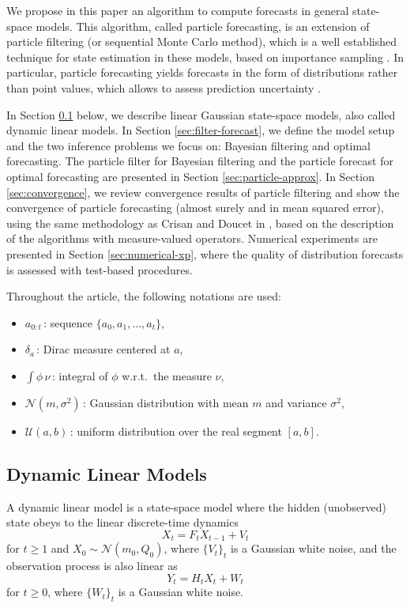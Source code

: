 \documentclass{article}
\begin{document}
We propose in this paper an algorithm to compute forecasts in general state-space models. This algorithm, called particle forecasting, is an extension of particle filtering (or sequential Monte Carlo method), which is a well established technique for state estimation in these models, based on importance sampling \cite{Arulampalam2002,Doucet2000,Doucet2011}. In particular, particle forecasting yields forecasts in the form of distributions rather than point values, which allows to assess prediction uncertainty \cite{Gneiting2014}.

In Section \ref{sec:dlm} below, we describe linear Gaussian state-space models, also called dynamic linear models. In Section \ref{sec:filter-forecast}, we define the model setup and the two inference problems we focus on: Bayesian filtering and optimal forecasting. The particle filter for Bayesian filtering and the particle forecast for optimal forecasting are presented in Section \ref{sec:particle-approx}. In Section \ref{sec:convergence}, we review convergence results of particle filtering and show the convergence of particle forecasting (almost surely and in mean squared error), using the same methodology as Crisan and Doucet in \cite{Crisan2002}, based on the description of the algorithms with measure-valued operators. Numerical experiments are presented in Section \ref{sec:numerical-xp}, where the quality of distribution forecasts is assessed with test-based procedures.

Throughout the article, the following notations are used:
\begin{itemize}
    \item $a_{0:t}$\,: sequence $\{a_0,a_1,\dots,a_t\}$,
    \item $\delta_a$\,: Dirac measure centered at $a$,
    \item $\displaystyle \int \phi \, \nu$\,: integral of $\phi$ w.r.t.\ the measure $\nu$,
    \item $\mathcal N(m,\sigma^2)$\,: Gaussian distribution with mean $m$ and variance $\sigma^2$,
    \item $\mathcal U(a,b)$\,: uniform distribution over the real segment $[a,b]$.
\end{itemize}

\subsection{Dynamic Linear Models}
\label{sec:dlm}

A dynamic linear model is a state-space model where the hidden (unobserved) state obeys to the linear discrete-time dynamics
\begin{equation*}
    X_t = F_t X_{t-1} + V_t
\end{equation*}
for $t \geq 1$ and $X_0 \sim \mathcal N(m_0, Q_0)$, where $\{V_t\}_t$ is a Gaussian white noise, and the observation process is also linear as
\begin{equation*}
    Y_t = H_t X_t + W_t
\end{equation*}
for $t \geq 0$, where $\{W_t\}_t$ is a Gaussian white noise.
\end{document}
